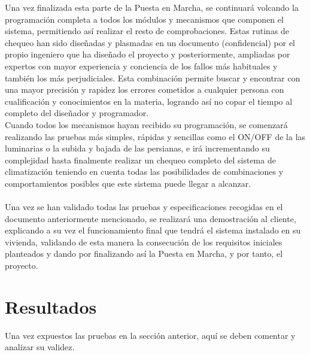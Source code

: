 Una vez finalizada esta parte de la Puesta en Marcha, se continuará volcando la programación completa a todos los módulos y mecanismos que componen el sistema, permitiendo así realizar el resto de comprobaciones. Estas rutinas de chequeo han sido diseñadas y plasmadas en un documento (confidencial) por el propio ingeniero que ha diseñado el proyecto y posteriormente, ampliadas por expertos con mayor experiencia y conciencia de los fallos más habituales y también los más perjudiciales. Esta combinación permite buscar y encontrar con una mayor precisión y rapidez los errores cometidos a cualquier persona con cualificación y conocimientos en la materia, logrando así no copar el tiempo al completo del diseñador y programador. \\

Cuando todos los mecanismos hayan recibido su programación, se comenzará realizando las pruebas más simples, rápidas y sencillas como el ON/OFF de la las luminarias o la subida y bajada de las persianas, e irá incrementando su complejidad hasta finalmente realizar un chequeo completo del sistema de climatización teniendo en cuenta todas las posibilidades de combinaciones y comportamientos posibles que este sistema puede llegar a alcanzar. \\\\
Una vez se han validado todas las pruebas y especificaciones recogidas en el documento anteriormente mencionado, se realizará una demostración al cliente, explicando a su vez el funcionamiento final que tendrá el sistema instalado en su vivienda, validando de esta manera la consecución de los requisitos iniciales planteados y dando por finalizando así la Puesta en Marcha, y por tanto, el proyecto.


\section{Resultados}

Una vez expuestos las pruebas en la sección anterior, aquí se deben comentar y analizar su validez.